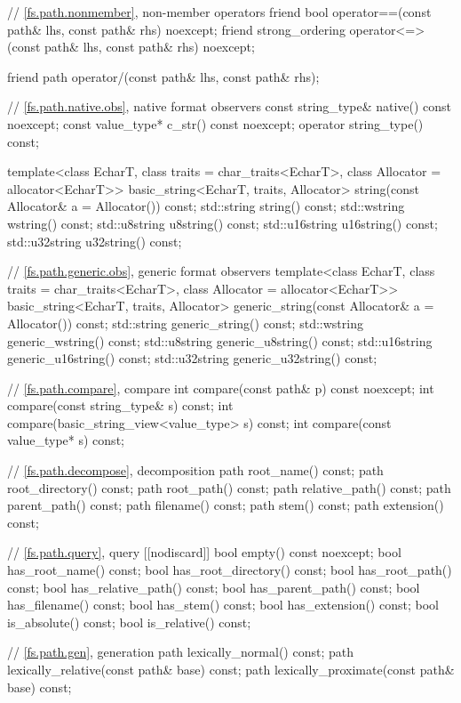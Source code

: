 \begin{codeblock}
{{    // \ref{fs.path.nonmember}, non-member operators
    friend bool operator==(const path& lhs, const path& rhs) noexcept;
    friend strong_ordering operator<=>(const path& lhs, const path& rhs) noexcept;

    friend path operator/(const path& lhs, const path& rhs);

    // \ref{fs.path.native.obs}, native format observers
    const string_type& native() const noexcept;
    const value_type*  c_str() const noexcept;
    operator string_type() const;

    template<class EcharT, class traits = char_traits<EcharT>,
             class Allocator = allocator<EcharT>>
      basic_string<EcharT, traits, Allocator>
        string(const Allocator& a = Allocator()) const;
    std::string    string() const;
    std::wstring   wstring() const;
    std::u8string  u8string() const;
    std::u16string u16string() const;
    std::u32string u32string() const;

    // \ref{fs.path.generic.obs}, generic format observers
    template<class EcharT, class traits = char_traits<EcharT>,
             class Allocator = allocator<EcharT>>
      basic_string<EcharT, traits, Allocator>
        generic_string(const Allocator& a = Allocator()) const;
    std::string    generic_string() const;
    std::wstring   generic_wstring() const;
    std::u8string  generic_u8string() const;
    std::u16string generic_u16string() const;
    std::u32string generic_u32string() const;

    // \ref{fs.path.compare}, compare
    int compare(const path& p) const noexcept;
    int compare(const string_type& s) const;
    int compare(basic_string_view<value_type> s) const;
    int compare(const value_type* s) const;

    // \ref{fs.path.decompose}, decomposition
    path root_name() const;
    path root_directory() const;
    path root_path() const;
    path relative_path() const;
    path parent_path() const;
    path filename() const;
    path stem() const;
    path extension() const;

    // \ref{fs.path.query}, query
    [[nodiscard]] bool empty() const noexcept;
    bool has_root_name() const;
    bool has_root_directory() const;
    bool has_root_path() const;
    bool has_relative_path() const;
    bool has_parent_path() const;
    bool has_filename() const;
    bool has_stem() const;
    bool has_extension() const;
    bool is_absolute() const;
    bool is_relative() const;

    // \ref{fs.path.gen}, generation
    path lexically_normal() const;
    path lexically_relative(const path& base) const;
    path lexically_proximate(const path& base) const;

}}
\end{codeblock}
